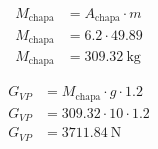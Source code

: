 \begin{align*}
  M_{\text{chapa}} & = A_{\text{chapa}} \cdot m        \\
  M_{\text{chapa}} & = \num{6.2} \cdot \num{49.89}     \\
  M_{\text{chapa}} & = \boxed{\SI{309.32}{\kilo\gram}}
\end{align*}

\begin{align*}
  G_{VP} & = M_{\text{chapa}} \cdot g \cdot \num{1.2}    \\
  G_{VP} & = \num{309.32} \cdot \num{10} \cdot \num{1.2} \\
  G_{VP} & = \boxed{\SI{3711.84}{\newton}}
\end{align*}